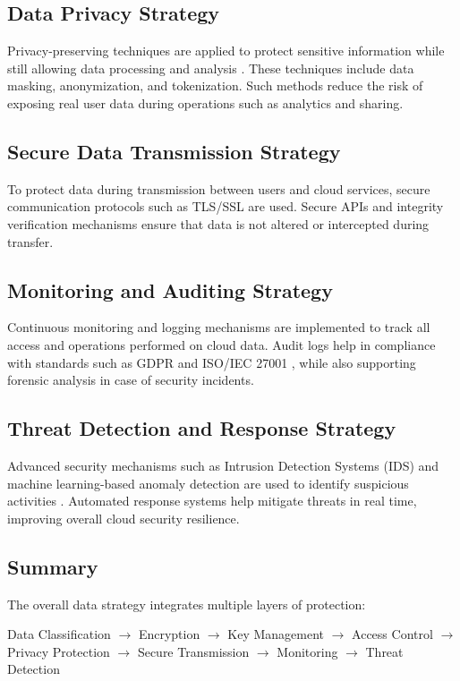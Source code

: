 \documentclass[12pt, a4paper]{article}
\begin{document}
\subsection{Data Privacy Strategy}
Privacy-preserving techniques are applied to protect sensitive information while still allowing data processing and analysis \cite{gdpr2018}. These techniques include data masking, anonymization, and tokenization. Such methods reduce the risk of exposing real user data during operations such as analytics and sharing.

\subsection{Secure Data Transmission Strategy}
To protect data during transmission between users and cloud services, secure communication protocols such as TLS/SSL are used. Secure APIs and integrity verification mechanisms ensure that data is not altered or intercepted during transfer.

\subsection{Monitoring and Auditing Strategy}
Continuous monitoring and logging mechanisms are implemented to track all access and operations performed on cloud data. Audit logs help in compliance with standards such as GDPR \cite{gdpr2018} and ISO/IEC 27001 \cite{iso27001}, while also supporting forensic analysis in case of security incidents.

\subsection{Threat Detection and Response Strategy}
Advanced security mechanisms such as Intrusion Detection Systems (IDS) and machine learning-based anomaly detection are used to identify suspicious activities \cite{li2023aisecurity}. Automated response systems help mitigate threats in real time, improving overall cloud security resilience.

\subsection{Summary}
The overall data strategy integrates multiple layers of protection:
\begin{center}
Data Classification $\rightarrow$ Encryption $\rightarrow$ Key Management $\rightarrow$ Access Control $\rightarrow$ Privacy Protection $\rightarrow$ Secure Transmission $\rightarrow$ Monitoring $\rightarrow$ Threat Detection
\end{center}
\end{document}
